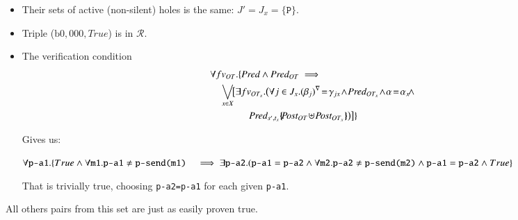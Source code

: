 \documentclass{elsarticle}
\newcommand{\nounderline}[1]{#1}
\begin{document}
\begin{itemize}
  \item Their sets of active (non-silent) holes is the same: $J' = J_x = \{\texttt{P}\}$.
  \item Triple ($\text{b0},  000,  True$) is in $\mathcal{R}$.
  \item The verification condition 
    \begin{align*}
&\forall fv_{OT}. \{ \Pred \land \Pred_{OT} \implies\\
&\quad \bigvee_{x\in X}\!\!
   \big[\exists fv_{OT_x}.
  \big( \forall j\in J_x. \vis{\beta_j}\!=\!\gamma_{jx}\! \land\! \Pred_{OT_x}
     \!\land\! \alpha\!=\!\alpha_x\! \land \\
&\qquad\qquad
     \Pred_{s',t_x}\subst{\Post_{OT}\!\uplus\!\Post_{OT_x}}\big)\big]\}
\end{align*}

\medskip Gives us:

$\forall \texttt{p-a1}. \{True \land \forall \texttt{m1}. \texttt{p-a1} \neq \texttt{p-send(m1)}\\
 \hspace{3mm} \implies \exists \texttt{p-a2}. 
(\texttt{p-a1} = \texttt{p-a2}
\land \forall \texttt{m2}. \texttt{p-a2} \neq \texttt{p-send(m2)}
\land \nounderline{\texttt{p-a1}} = \nounderline{\texttt{p-a2}} 
\land True\}$

\medskip That is trivially true, choosing \texttt{p-a2=p-a1} for each given \texttt{p-a1}.

\end{itemize}

  \bigskip
  All others pairs from this set are just as easily proven true.
\end{document}

